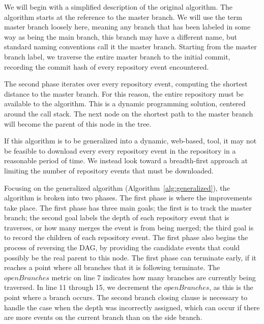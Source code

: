 We will begin with a simplified description of the original algorithm.
The algorithm starts at the reference to the master branch. We will use
the term master branch loosely here, meaning any branch that has been
labeled in some way as being the main branch, this branch may have a
different name, but standard naming conventions call it the master
branch. Starting from the master branch label, we traverse the entire
master branch to the initial commit, recording the commit hash of every
repository event encountered.

The second phase iterates over every repository event, computing the
shortest distance to the master branch. For this reason, the entire
repository must be available to the algorithm. This is a dynamic
programming solution, centered around the call stack. The next node on
the shortest path to the master branch will become the parent of this
node in the tree.

If this algorithm is to be generalized into a dynamic, web-based, tool,
it may not be feasible to download every every repository event in the
repository in a reasonable period of time. We instead look toward a
breadth-first approach at limiting the number of repository events that
must be downloaded.

Focusing on the generalized algorithm (Algorithm~\ref{alg:generalized}),
the algorithm is broken into two phases. The first phase is where the
improvements take place. The first phase has three main goals; the first
is to track the master branch; the second goal labels the depth of each
repository event that is traverses, or how many merges the event is from
being merged; the third goal is to record the children of each
repository event. The first phase also begins the process of reversing
the DAG, by providing the candidate events that could possibly be the
real parent to this node. The first phase can terminate early, if it
reaches a point where all branches that it is following terminate. The
$openBranches$ metric on line 7 indicates how many branches are
currently being traversed. In line 11 through 15, we decrement the
$openBranches$, as this is the point where a branch occurs. The second
branch closing clause is necessary to handle the case when the depth was
incorrectly assigned, which can occur if there are more events on the
current branch than on the side branch.

